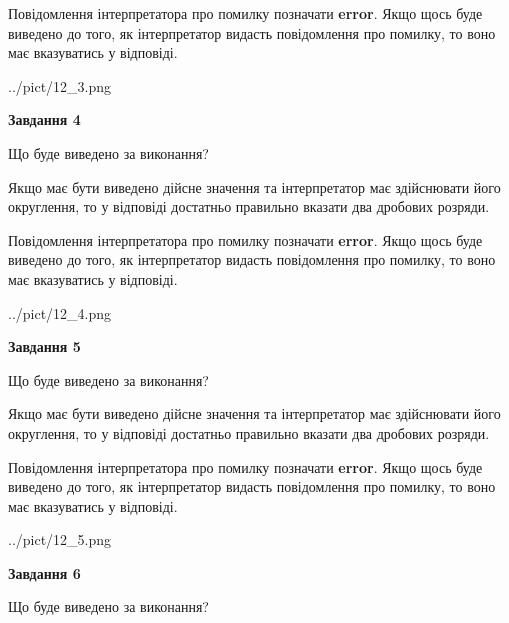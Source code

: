 \documentclass[12pt, ukrainian]{article}
\begin{document}
{\begin {Large}
Повідомлення інтерпретатора про помилку позначати \textbf{error}.
Якщо щось буде виведено до того, як інтерпретатор видасть повідомлення про помилку, 
то воно має вказуватись у відповіді. \par

\begin{center}
	{../pict/12_3.png}
\end{center}
\newpage

{\begin {center}\textbf{Завдання 4}\end {center}}\par
Що буде виведено за виконання? \par

Якщо має бути виведено дійсне значення та інтерпретатор має здійснювати його округлення, 
то у відповіді достатньо правильно вказати два дробових розряди.

Повідомлення інтерпретатора про помилку позначати \textbf{error}.
Якщо щось буде виведено до того, як інтерпретатор видасть повідомлення про помилку, 
то воно має вказуватись у відповіді. \par

\begin{center}
	{../pict/12_4.png}
\end{center}
\newpage

{\begin {center}\textbf{Завдання 5}\end {center}}\par
Що буде виведено за виконання? \par

Якщо має бути виведено дійсне значення та інтерпретатор має здійснювати його округлення, 
то у відповіді достатньо правильно вказати два дробових розряди.

Повідомлення інтерпретатора про помилку позначати \textbf{error}.
Якщо щось буде виведено до того, як інтерпретатор видасть повідомлення про помилку, 
то воно має вказуватись у відповіді. \par

\begin{center}
	{../pict/12_5.png}
\end{center}
\newpage

{\begin {center}\textbf{Завдання 6}\end {center}}\par
Що буде виведено за виконання? \par


\end{Large}}
\end{document}
